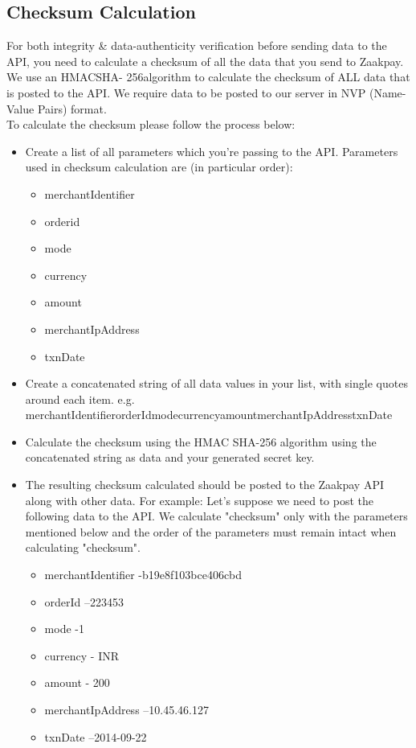 \documentclass{article}
\begin{document}
\subsection{Checksum Calculation}
For both integrity \& data-authenticity verification before sending data to the API, you need to calculate a checksum of all the data that you send to Zaakpay. We use an HMACSHA- 256algorithm to calculate the checksum of ALL data that is posted to the API. We require data to be posted to our server in NVP (Name-Value Pairs) format.
\\ To calculate the checksum please follow the process below:
\begin{itemize}
\item Create a list of all parameters which you're passing to the API. Parameters used in checksum calculation are (in particular order):
\begin{itemize}
\item merchantIdentifier
\item orderid
\item mode
\item currency
\item amount
\item merchantIpAddress
\item txnDate
\end{itemize}
\item Create a concatenated string of all data values in your list, with single quotes around each item. e.g. \textquotesingle{}merchantIdentifier\textquotesingle{}\textquotesingle{}orderId\textquotesingle{}\textquotesingle{}mode\textquotesingle{}\textquotesingle{}currency\textquotesingle{}\textquotesingle{}amount\textquotesingle{}\textquotesingle{}merchantIpAddress\textquotesingle{}\textquotesingle{}txnDate\textquotesingle{}

\item Calculate the checksum using the HMAC SHA-256 algorithm using the concatenated string as data and your generated secret key.
\item The resulting checksum calculated should be posted to the Zaakpay API along with other data. For example: Let's suppose we need to post the following data to the API. We calculate "checksum" only with the parameters mentioned below and the order of the parameters must remain intact when calculating "checksum".
\begin{itemize}
\item merchantIdentifier -b19e8f103bce406cbd
\item orderId –223453
\item mode -1
\item currency - INR
\item amount - 200
\item merchantIpAddress –10.45.46.127
\item txnDate –2014-09-22
\end{itemize}
\end{itemize}
\end{document}
